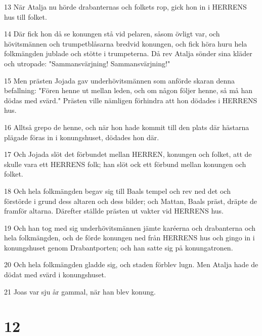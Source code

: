 \par 13 När Atalja nu hörde drabanternas och folkets rop, gick hon in i HERRENS hus till folket.
\par 14 Där fick hon då se konungen stå vid pelaren, såsom övligt var, och hövitsmännen och trumpetblåsarna bredvid konungen, och fick höra huru hela folkmängden jublade och stötte i trumpeterna. Då rev Atalja sönder sina kläder och utropade: "Sammansvärjning! Sammansvärjning!"
\par 15 Men prästen Jojada gav underhövitsmännen som anförde skaran denna befallning: "Fören henne ut mellan leden, och om någon följer henne, så må han dödas med svärd." Prästen ville nämligen förhindra att hon dödades i HERRENS hus.
\par 16 Alltså grepo de henne, och när hon hade kommit till den plats där hästarna plägade föras in i konungshuset, dödades hon där.
\par 17 Och Jojada slöt det förbundet mellan HERREN, konungen och folket, att de skulle vara ett HERRENS folk; han slöt ock ett förbund mellan konungen och folket.
\par 18 Och hela folkmängden begav sig till Baals tempel och rev ned det och förstörde i grund dess altaren och dess bilder; och Mattan, Baals präst, dräpte de framför altarna. Därefter ställde prästen ut vakter vid HERRENS hus.
\par 19 Och han tog med sig underhövitsmännen jämte karéerna och drabanterna och hela folkmängden, och de förde konungen ned från HERRENS hus och gingo in i konungshuset genom Drabantporten; och han satte sig på konungatronen.
\par 20 Och hela folkmängden gladde sig, och staden förblev lugn. Men Atalja hade de dödat med svärd i konungshuset.
\par 21 Joas var sju år gammal, när han blev konung.

\chapter{12}

